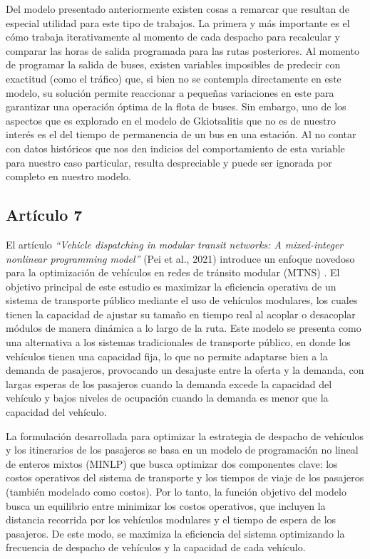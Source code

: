 \documentclass[preprint,11pt]{elsarticle}
\begin{document}
Del modelo presentado anteriormente existen cosas a remarcar que resultan de especial utilidad para este tipo de trabajos. La primera y más importante es el cómo trabaja iterativamente al momento de cada despacho para recalcular y comparar las horas de salida programada para las rutas posteriores. Al momento de programar la salida de buses, existen variables imposibles de predecir con exactitud (como el tráfico) que, si bien no se contempla directamente en este modelo, su solución permite reaccionar a pequeñas variaciones en este para garantizar una operación óptima de la flota de buses. Sin embargo, uno de los aspectos que es explorado en el modelo de Gkiotsalitis que no es de nuestro interés es el del tiempo de permanencia de un bus en una estación. Al no contar con datos históricos que nos den indicios del comportamiento de esta variable para nuestro caso particular, resulta despreciable y puede ser ignorada por completo en nuestro modelo.

\subsection*{Artículo 7}

El artículo \textit{“Vehicle dispatching in modular transit networks: A mixed-integer nonlinear programming model”} (Pei et al., 2021) introduce un enfoque novedoso para la optimización de vehículos en redes de tránsito modular (MTNS) \parencite{pei2021}. El objetivo principal de este estudio es maximizar la eficiencia operativa de un sistema de transporte público mediante el uso de vehículos modulares, los cuales tienen la capacidad de ajustar su tamaño en tiempo real al acoplar o desacoplar módulos de manera dinámica a lo largo de la ruta. Este modelo se presenta como una alternativa a los sistemas tradicionales de transporte público, en donde los vehículos tienen una capacidad fija, lo que no permite adaptarse bien a la demanda de pasajeros, provocando un desajuste entre la oferta y la demanda, con largas esperas de los pasajeros cuando la demanda excede la capacidad del vehículo y bajos niveles de ocupación cuando la demanda es menor que la capacidad del vehículo.

La formulación desarrollada para optimizar la estrategia de despacho de vehículos y los itinerarios de los pasajeros se basa en un modelo de programación no lineal de enteros mixtos (MINLP) que busca optimizar dos componentes clave: los costos operativos del sistema de transporte y los tiempos de viaje de los pasajeros (también modelado como costos). Por lo tanto, la función objetivo del modelo busca un equilibrio entre minimizar los costos operativos, que incluyen la distancia recorrida por los vehículos modulares y el tiempo de espera de los pasajeros. De este modo, se maximiza la eficiencia del sistema optimizando la frecuencia de despacho de vehículos y la capacidad de cada vehículo.
\end{document}
